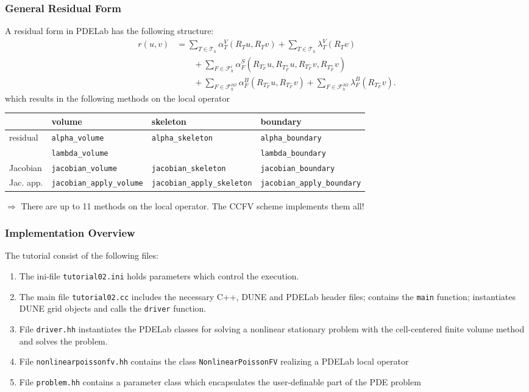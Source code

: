 \documentclass[ignorenonframetext,11pt]{beamer}
\theoremstyle{definition}
\begin{document}
\begin{frame}
\frametitle{General Residual Form}
A residual form in PDELab has the following structure:
\begin{equation*}
\begin{split}
r(u,v) &=
\sum_{T\in\mathcal{T}_h} \alpha_T^V(R_T u, R_T v)
+ \sum_{T\in\mathcal{T}_h} \lambda_T^V(R_T v) \\
&\qquad+ \sum_{F\in\mathcal{F}_h^i} \alpha_F^S(R_{T_F^-} u,R_{T_F^+} u, R_{T_F^-} v, R_{T_F^+} v)\\
&\qquad+ \sum_{F\in\mathcal{F}_h^{\partial\Omega}} \alpha_F^B(R_{T_F^-} u, R_{T_F^-} v)
+ \sum_{F\in\mathcal{F}_h^{\partial\Omega}} \lambda_F^B(R_{T_F^-} v) .
\end{split}\label{eq:GeneralResidualForm}
\end{equation*}
which results in the following methods on the local operator
\begin{center}
\tiny
\begin{tabular}{l|l|l|l}
    & volume & skeleton & boundary \\
\hline
residual    & \lstinline!alpha_volume! & \lstinline!alpha_skeleton! & \lstinline!alpha_boundary! \\
                & \lstinline!lambda_volume! & & \lstinline!lambda_boundary! \\
\hline
Jacobian  & \lstinline!jacobian_volume! & \lstinline!jacobian_skeleton! & \lstinline!jacobian_boundary! \\
\hline
Jac.  app.  & \lstinline!jacobian_apply_volume! & \lstinline!jacobian_apply_skeleton! &
\lstinline!jacobian_apply_boundary!
\end{tabular}
\end{center}
$\Rightarrow$ There are up to 11 methods on the local operator. The CCFV scheme implements them all!
\end{frame}

\begin{frame}
\frametitle{Implementation Overview}
The tutorial consist of the following files:
\begin{enumerate}[1)]
\item The ini-file
\lstinline{tutorial02.ini} holds parameters
which control the execution.
\item The main file \lstinline{tutorial02.cc} includes the necessary C++,
DUNE and PDELab header files;
contains the \lstinline{main} function;
instantiates DUNE grid objects and calls the \lstinline{driver} function.
\item File \lstinline{driver.hh} instantiates the PDELab classes
for solving a nonlinear stationary problem with the cell-centered finite
volume method and solves the problem.
\item File \lstinline{nonlinearpoissonfv.hh} contains the class
\lstinline{NonlinearPoissonFV} realizing a PDELab local operator
\item File \lstinline{problem.hh} contains a parameter class which
encapsulates the user-definable part of the PDE problem
\end{enumerate}
\end{frame}
\end{document}
